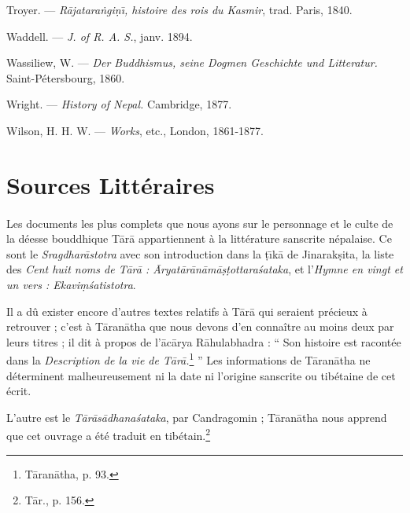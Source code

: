 \documentclass[a4paper, 11pt, oneside, french]{article}
\begin{document}
Troyer. --- \emph{R\={a}jatara\.{n}gi\d{n}\={\i}, histoire des rois du Kasmir}, trad. Paris, 1840.

Waddell. --- \emph{J. of R. A. S.}, janv. 1894.

Wassiliew, W. --- \emph{Der Buddhismus, seine Dogmen Geschichte und Litteratur.} Saint-Pétersbourg, 1860.

Wright. --- \emph{History of Nepal.} Cambridge, 1877.

Wilson, H. H. W. --- \emph{Works}, etc., London, 1861-1877.
\clearpage
\normalsize
\section{Sources Littéraires}
\paragraph{}
Les documents les plus complets que nous ayons sur le personnage et le culte de la déesse bouddhique T\={a}r\={a} appartiennent à la littérature sanscrite népalaise. Ce sont le \emph{Sragdhar\={a}stotra} avec son introduction dans la \d{t}\={\i}k\={a} de Jinarak\d{s}ita, la liste des \emph{Cent huit noms de T\={a}r\={a} : \={A}ryat\={a}r\={a}n\={a}m\={a}\d{s}\d{t}ottara\'{s}ataka}, et l'\emph{Hymne en vingt et un vers : Ekavi\d{m}\'{s}atistotra}.

Il a dû exister encore d'autres textes relatifs à T\={a}r\={a} qui seraient précieux à retrouver ; c'est à T\={a}ran\={a}tha que nous devons d'en connaître au moins deux par leurs titres ; il dit à propos de l'\={a}c\={a}rya R\={a}hulabhadra : `` Son histoire est racontée dans la \emph{Description de la vie de T\={a}r\={a}.}\footnote{T\={a}ran\={a}tha, p. 93.} '' Les informations de T\={a}ran\={a}tha ne déterminent malheureusement ni la date ni l'origine sanscrite ou tibétaine de cet écrit.

L'autre est le \emph{T\={a}r\={a}s\={a}dhana\'{s}ataka}, par Candragomin ; T\={a}ran\={a}tha nous apprend que cet ouvrage a été traduit en tibétain.\footnote{T\={a}r., p. 156.}
\end{document}
